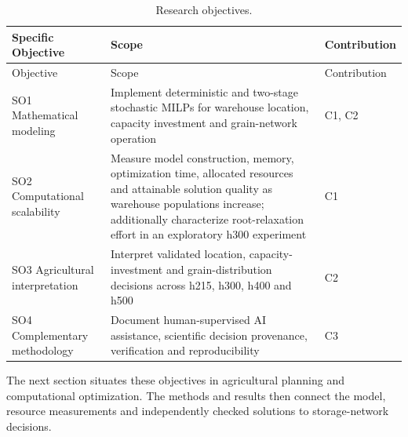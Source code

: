 \documentclass[
  english,
  11pt,
  a4paper,
  authoryear,
  preprint]{elsarticle}
\begin{document}
\begin{longtable}[]{@{}
  >{\raggedright\arraybackslash}p{}
  >{\raggedright\arraybackslash}p{}
  >{\raggedright\arraybackslash}p{}@{}}
\caption{Research objectives.}\label{tbl-objectives}\tabularnewline
\toprule\noalign{}
\begin{minipage}[b]{\linewidth}\raggedright
Specific Objective
\end{minipage} & \begin{minipage}[b]{\linewidth}\raggedright
Scope
\end{minipage} & \begin{minipage}[b]{\linewidth}\raggedright
Contribution
\end{minipage} \\
\midrule\noalign{}
\endfirsthead
\toprule\noalign{}
\begin{minipage}[b]{\linewidth}\raggedright
Objective
\end{minipage} & \begin{minipage}[b]{\linewidth}\raggedright
Scope
\end{minipage} & \begin{minipage}[b]{\linewidth}\raggedright
Contribution
\end{minipage} \\
\midrule\noalign{}
\endhead
\bottomrule\noalign{}
\endlastfoot
SO1 Mathematical modeling & Implement deterministic and two-stage
stochastic MILPs for warehouse location, capacity investment and
grain-network operation & C1, C2 \\
SO2 Computational scalability & Measure model construction, memory,
optimization time, allocated resources and attainable solution quality
as warehouse populations increase; additionally characterize root-relaxation effort in an exploratory h300 experiment & C1 \\
SO3 Agricultural interpretation & Interpret validated location,
capacity-investment and grain-distribution decisions across h215, h300,
h400 and h500  & C2 \\
SO4 Complementary methodology & Document human-supervised AI assistance,
scientific decision provenance, verification and reproducibility & C3 \\
\end{longtable}

The next section situates these objectives in agricultural planning and computational optimization. The methods and results then connect the
model, resource measurements and independently checked solutions to storage-network decisions.
\end{document}
